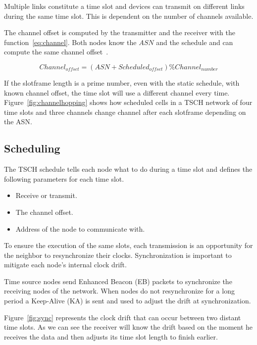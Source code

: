 Multiple links constitute a time slot and devices can transmit on different
links during the same time slot.
This is dependent on the number of channels available.

The channel offset is computed by the transmitter and the receiver with the
function~\ref{eq:channel}. Both nodes know the $ASN$ and the schedule and can
compute the same channel offset~\cite{rfc7554}.

\begin{equation}
  \label{eq:channel}
  Channel_{offset} = (ASN + Scheduled_{offset}) \% Channel_{number}
\end{equation}

If the slotframe length is a prime number, even with the static schedule,
with known channel offset, the time slot will use a different channel every time.
Figure~\ref{fig:channelhopping} shows how scheduled cells in a TSCH network of
four time slots and three channels change channel after each slotframe depending
on the ASN.



\subsection{Scheduling}

The TSCH schedule tells each node what to do during a time slot and defines the
following parameters for each time slot.

\begin{itemize}
  \item Receive or transmit.
  \item The channel offset.
  \item Address of the node to communicate with.
\end{itemize}

To ensure the execution of the same slots, each transmission is an opportunity
for the neighbor to resynchronize their clocks.
Synchronization is important to mitigate each node's internal clock drift.

Time source nodes send Enhanced Beacon (EB) packets to synchronize the receiving
nodes of the network. When nodes do not resynchronize for a long period
a Keep-Alive (KA) is sent and used to adjust the drift at synchronization.

Figure~\ref{fig:sync} represents the clock drift that can occur between two
distant time slots.
As we can see the receiver will know the drift based on the moment he receives
the data and then adjusts its time slot length to finish earlier.

